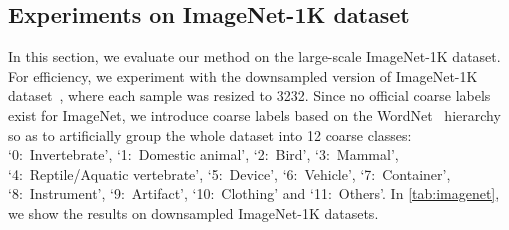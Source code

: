 \documentclass[10pt,twocolumn,letterpaper]{article}
\begin{document}
\subsection{Experiments on ImageNet-1K dataset}\label{exp:in1k}
In this section, we evaluate our method on the large-scale ImageNet-1K dataset. For efficiency, we experiment with the downsampled version of ImageNet-1K dataset~\cite{chrabaszcz2017downsampled}, where each sample was resized to 3232. 
Since no official coarse labels exist for ImageNet, we introduce coarse labels based on the WordNet~\cite{miller1998wordnet} hierarchy so as to artificially group the whole dataset into 12 coarse classes: `0:~Invertebrate', `1:~Domestic animal', `2:~Bird', `3:~Mammal', `4:~Reptile/Aquatic vertebrate', `5:~Device', `6:~Vehicle', `7:~Container', `8:~Instrument', `9:~Artifact', `10:~Clothing' and `11:~Others'. In \cref{tab:imagenet}, we show the results on downsampled ImageNet-1K datasets. 

\begin{table}[htbp]
\centering
{}
\caption{Results on ImageNet-1K dataset.}
\label{tab:imagenet}
\end{table}
\end{document}
